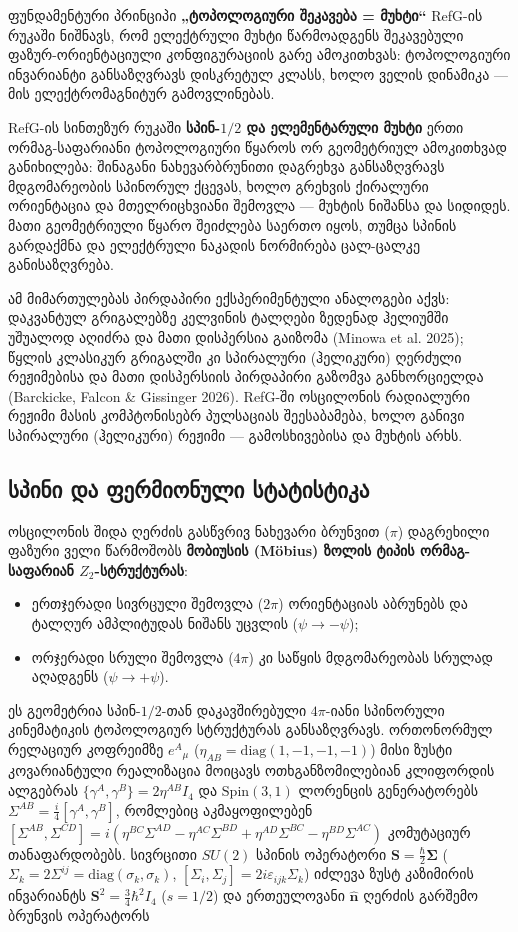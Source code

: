 \documentclass[11pt,a4paper]{article}
\begin{document}
ფუნდამენტური პრინციპი \textbf{„ტოპოლოგიური შეკავება = მუხტი“} RefG-ის რუკაში ნიშნავს, რომ ელექტრული მუხტი წარმოადგენს შეკავებული ფაზურ-ორიენტაციული კონფიგურაციის გარე ამოკითხვას: ტოპოლოგიური ინვარიანტი განსაზღვრავს დისკრეტულ კლასს, ხოლო ველის დინამიკა — მის ელექტრომაგნიტურ გამოვლინებას.

RefG-ის სინთეზურ რუკაში \textbf{სპინ-$1/2$ და ელემენტარული მუხტი} ერთი ორმაგ-საფარიანი ტოპოლოგიური წყაროს ორ გეომეტრიულ ამოკითხვად განიხილება: შინაგანი ნახევარბრუნითი დაგრეხვა განსაზღვრავს მდგომარეობის სპინორულ ქცევას, ხოლო გრეხვის ქირალური ორიენტაცია და მთელრიცხვიანი შემოვლა — მუხტის ნიშანსა და სიდიდეს. მათი გეომეტრიული წყარო შეიძლება საერთო იყოს, თუმცა სპინის გარდაქმნა და ელექტრული ნაკადის ნორმირება ცალ-ცალკე განისაზღვრება.

ამ მიმართულებას პირდაპირი ექსპერიმენტული ანალოგები აქვს: დაკვანტულ გრიგალებზე კელვინის ტალღები ზედენად ჰელიუმში უშუალოდ აღიძრა და მათი დისპერსია გაიზომა (Minowa et al. 2025); წყლის კლასიკურ გრიგალში კი სპირალური (ჰელიკური) ღერძული რეჟიმებისა და მათი დისპერსიის პირდაპირი გაზომვა განხორციელდა (Barckicke, Falcon \& Gissinger 2026). RefG-ში ოსცილონის რადიალური რეჟიმი მასის კომპტონისებრ პულსაციას შეესაბამება, ხოლო განივი სპირალური (ჰელიკური) რეჟიმი — გამოსხივებისა და მუხტის არხს.


\subsection{სპინი და ფერმიონული სტატისტიკა}

ოსცილონის შიდა ღერძის გასწვრივ ნახევარი ბრუნვით ($\pi$) დაგრეხილი ფაზური ველი წარმოშობს \textbf{მობიუსის (Möbius) ზოლის ტიპის ორმაგ-საფარიან $Z_2$-სტრუქტურას}:

\begin{itemize}
\item ერთჯერადი სივრცული შემოვლა ($2\pi$) ორიენტაციას აბრუნებს და ტალღურ ამპლიტუდას ნიშანს უცვლის ($\psi \to -\psi$);
\item ორჯერადი სრული შემოვლა ($4\pi$) კი საწყის მდგომარეობას სრულად აღადგენს ($\psi \to +\psi$).

\end{itemize}
ეს გეომეტრია სპინ-$1/2$-თან დაკავშირებული $4\pi$-იანი სპინორული კინემატიკის ტოპოლოგიურ სტრუქტურას განსაზღვრავს. ორთონორმულ რელაციურ კოფრეიმზე $e^A{}_\mu$ ($\eta_{AB} = \mathrm{diag}(1,-1,-1,-1)$) მისი ზუსტი კოვარიანტული რეალიზაცია მოიცავს ოთხგანზომილებიან კლიფორდის ალგებრას $\{\gamma^A, \gamma^B\} = 2\eta^{AB}I_4$ და $\mathrm{Spin}(3,1)$ ლორენცის გენერატორებს $\Sigma^{AB} = \frac{i}{4}[\gamma^A, \gamma^B]$, რომლებიც აკმაყოფილებენ $[\Sigma^{AB}, \Sigma^{CD}] = i(\eta^{BC}\Sigma^{AD} - \eta^{AC}\Sigma^{BD} + \eta^{AD}\Sigma^{BC} - \eta^{BD}\Sigma^{AC})$ კომუტაციურ თანაფარდობებს. სივრცითი $SU(2)$ სპინის ოპერატორი $\mathbf{S} = \frac{\hbar}{2}\boldsymbol{\Sigma}$ ($\Sigma_k = 2\Sigma^{ij} = \mathrm{diag}(\sigma_k, \sigma_k)$, $[\Sigma_i, \Sigma_j] = 2i\varepsilon_{ijk}\Sigma_k$) იძლევა ზუსტ კაზიმირის ინვარიანტს $\mathbf{S}^2 = \frac{3}{4}\hbar^2 I_4$ ($s = 1/2$) და ერთეულოვანი $\hat{\mathbf{n}}$ ღერძის გარშემო ბრუნვის ოპერატორს
\end{document}
